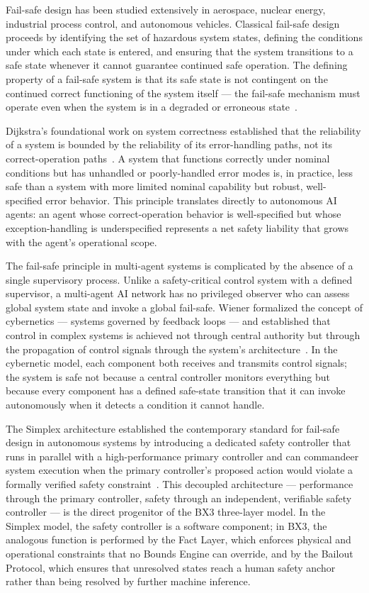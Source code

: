 Fail-safe design has been studied extensively in aerospace, nuclear energy, industrial process control, and autonomous vehicles. Classical fail-safe design proceeds by identifying the set of hazardous system states, defining the conditions under which each state is entered, and ensuring that the system transitions to a safe state whenever it cannot guarantee continued safe operation. The defining property of a fail-safe system is that its safe state is not contingent on the continued correct functioning of the system itself --- the fail-safe mechanism must operate even when the system is in a degraded or erroneous state~\cite{dijkstra1982,wiener1948}.

Dijkstra's foundational work on system correctness established that the reliability of a system is bounded by the reliability of its error-handling paths, not its correct-operation paths~\cite{dijkstra1982}. A system that functions correctly under nominal conditions but has unhandled or poorly-handled error modes is, in practice, less safe than a system with more limited nominal capability but robust, well-specified error behavior. This principle translates directly to autonomous AI agents: an agent whose correct-operation behavior is well-specified but whose exception-handling is underspecified represents a net safety liability that grows with the agent's operational scope.

The fail-safe principle in multi-agent systems is complicated by the absence of a single supervisory process. Unlike a safety-critical control system with a defined supervisor, a multi-agent AI network has no privileged observer who can assess global system state and invoke a global fail-safe. Wiener formalized the concept of cybernetics --- systems governed by feedback loops --- and established that control in complex systems is achieved not through central authority but through the propagation of control signals through the system's architecture~\cite{wiener1948}. In the cybernetic model, each component both receives and transmits control signals; the system is safe not because a central controller monitors everything but because every component has a defined safe-state transition that it can invoke autonomously when it detects a condition it cannot handle.

The Simplex architecture established the contemporary standard for fail-safe design in autonomous systems by introducing a dedicated safety controller that runs in parallel with a high-performance primary controller and can commandeer system execution when the primary controller's proposed action would violate a formally verified safety constraint~\cite{bansal2019}. This decoupled architecture --- performance through the primary controller, safety through an independent, verifiable safety controller --- is the direct progenitor of the BX3 three-layer model. In the Simplex model, the safety controller is a software component; in BX3, the analogous function is performed by the Fact Layer, which enforces physical and operational constraints that no Bounds Engine can override, and by the Bailout Protocol, which ensures that unresolved states reach a human safety anchor rather than being resolved by further machine inference.

